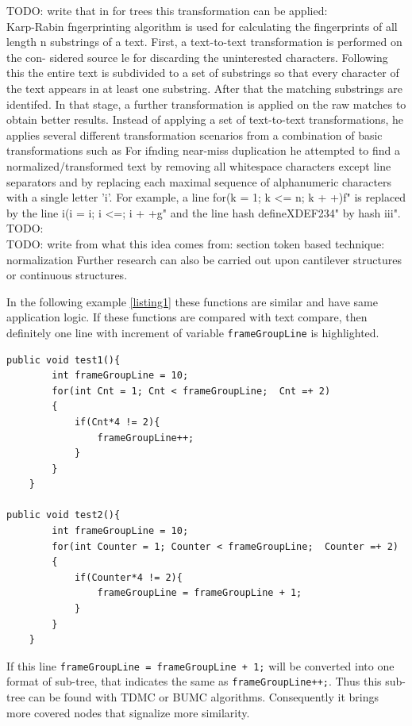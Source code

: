 \documentclass{report}
\begin{document}
TODO: write that in for trees this transformation can be applied:\\
Karp-Rabin fngerprinting algorithm is used for calculating the fingerprints of all
length n substrings of a text. First, a text-to-text transformation is performed on the con-
sidered source le for discarding the uninterested characters. Following this the entire text
is subdivided to a set of substrings so that every character of the text appears in at least
one substring. After that the matching substrings are identifed. In that stage, a further
transformation is applied on the raw matches to obtain better results. Instead of applying
a set of text-to-text transformations, he applies several different transformation scenarios
from a combination of basic transformations such as  For ifnding near-miss duplication he
attempted to find a normalized/transformed text by removing all whitespace characters
except line separators and by replacing each maximal sequence of alphanumeric characters
with a single letter 'i'. For example, a line for(k = 1; k <= n; k + +)f" is replaced by
the line i(i = i; i <=; i + +g" and the line hash defineXDEF234" by hash iii".
TODO:
\\

TODO: write from what this idea comes from: section token based technique: normalization
Further research can also be carried out upon cantilever structures or continuous structures.

In the following example \ref{listing1} these functions are similar and have same application logic. If these functions are compared with text compare, then definitely one line with increment of variable \texttt{frameGroupLine} is highlighted. 
\newpage
\begin{lstlisting}[caption={Clone pair between FreeBSD and Linux}, label = listing1]
public void test1(){
		int frameGroupLine = 10;
		for(int Cnt = 1; Cnt < frameGroupLine;  Cnt =+ 2)
		{
			if(Cnt*4 != 2){
				frameGroupLine++;
			}
		}
	}
	
public void test2(){
		int frameGroupLine = 10;
		for(int Counter = 1; Counter < frameGroupLine;  Counter =+ 2)
		{
			if(Counter*4 != 2){ 
				frameGroupLine = frameGroupLine + 1;
			}
		}
	}	
\end{lstlisting}

If this line \texttt{frameGroupLine = frameGroupLine + 1;} will be converted into one format of sub-tree, that indicates the same as \texttt{frameGroupLine++;}. Thus this sub-tree can be found with TDMC or BUMC algorithms. Consequently it brings more covered nodes that signalize more similarity. 
\end{document}
